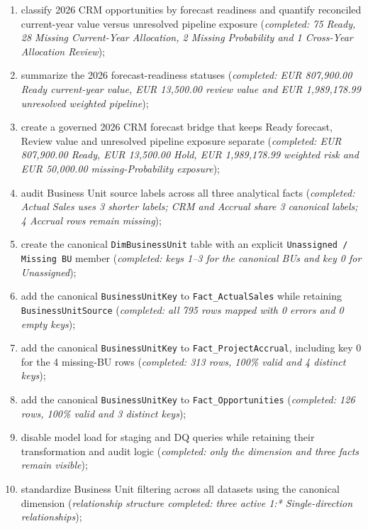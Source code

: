 \documentclass[11pt,a4paper]{article}
\begin{document}
\begin{enumerate}[leftmargin=9mm,itemsep=4pt]
    (\textit{completed: 30 records, EUR 3,572,367.98 estimated value and
    EUR 1,989,178.99 weighted value});
    \item classify 2026 CRM opportunities by forecast readiness and quantify
    reconciled current-year value versus unresolved pipeline exposure
    (\textit{completed: 75 Ready, 28 Missing Current-Year Allocation,
    2 Missing Probability and 1 Cross-Year Allocation Review});
    \item summarize the 2026 forecast-readiness statuses
    (\textit{completed: EUR 807,900.00 Ready current-year value,
    EUR 13,500.00 review value and EUR 1,989,178.99 unresolved weighted pipeline});
    \item create a governed 2026 CRM forecast bridge that keeps Ready forecast,
    Review value and unresolved pipeline exposure separate
    (\textit{completed: EUR 807,900.00 Ready, EUR 13,500.00 Hold,
    EUR 1,989,178.99 weighted risk and EUR 50,000.00 missing-Probability exposure});
    \item audit Business Unit source labels across all three analytical facts
    (\textit{completed: Actual Sales uses 3 shorter labels; CRM and Accrual share
    3 canonical labels; 4 Accrual rows remain missing});
    \item create the canonical \texttt{DimBusinessUnit} table with an explicit
    \texttt{Unassigned / Missing BU} member
    (\textit{completed: keys 1--3 for the canonical BUs and key 0 for Unassigned});
    \item add the canonical \texttt{BusinessUnitKey} to \texttt{Fact\_ActualSales}
    while retaining \texttt{BusinessUnitSource}
    (\textit{completed: all 795 rows mapped with 0 errors and 0 empty keys});
    \item add the canonical \texttt{BusinessUnitKey} to
    \texttt{Fact\_ProjectAccrual}, including key 0 for the 4 missing-BU rows
    (\textit{completed: 313 rows, 100\% valid and 4 distinct keys});
    \item add the canonical \texttt{BusinessUnitKey} to
    \texttt{Fact\_Opportunities}
    (\textit{completed: 126 rows, 100\% valid and 3 distinct keys});
    \item disable model load for staging and DQ queries while retaining their
    transformation and audit logic
    (\textit{completed: only the dimension and three facts remain visible});
    \item standardize Business Unit filtering across all datasets using the canonical
    dimension
    (\textit{relationship structure completed: three active 1:* Single-direction relationships});

\end{enumerate}
\end{document}
